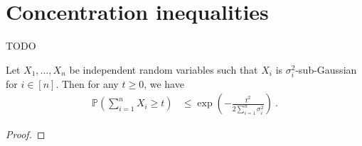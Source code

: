 \chapter{Concentration inequalities}

\begin{definition}\label{def:subGaussian}
  \mathlibok
TODO
\end{definition}


\begin{theorem}\label{thm:hoeffding}
  \mathlibok
Let $X_1, \ldots, X_n$ be independent random variables such that $X_i$ is $\sigma_i^2$-sub-Gaussian for $i \in [n]$.
Then for any $t \ge 0$, we have
\begin{align*}
  \mathbb{P}\left(\sum_{i=1}^n X_i \ge t\right)
  &\le \exp\left(- \frac{t^2}{2 \sum_{i=1}^n \sigma_i^2}\right)
  \: .
\end{align*}
\end{theorem}

\begin{proof}

\end{proof}

